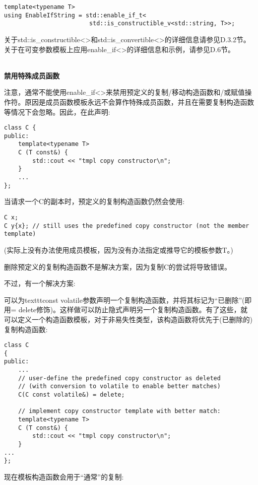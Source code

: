 \begin{lstlisting}[style=styleCXX]
template<typename T>
using EnableIfString = std::enable_if_t<
						std::is_constructible_v<std::string, T>>;
\end{lstlisting}

关于std::is\_constructible<>和std::is\_convertible<>的详细信息请参见D.3.2节。关于在可变参数模板上应用enable\_if<>的详细信息和示例，请参见D.6节。

\hspace*{\fill} \\ %
\noindent
\textbf{禁用特殊成员函数}

注意，通常不能使用enable\_if<>来禁用预定义的复制/移动构造函数和/或赋值操作符。原因是成员函数模板永远不会算作特殊成员函数，并且在需要复制构造函数等情况下会忽略。因此，在此声明:

\begin{lstlisting}[style=styleCXX]
class C {
public:
	template<typename T>
	C (T const&) {
		std::cout << "tmpl copy constructor\n";
	}
	...
};
\end{lstlisting}

当请求一个C的副本时，预定义的复制构造函数仍然会使用:

\begin{lstlisting}[style=styleCXX]
C x;
C y{x}; // still uses the predefined copy constructor (not the member template)
\end{lstlisting}

(实际上没有办法使用成员模板，因为没有办法指定或推导它的模板参数T。)

删除预定义的复制构造函数不是解决方案，因为复制C的尝试将导致错误。

不过，有一个解决方案:

可以为texttt{const volatile}参数声明一个复制构造函数，并将其标记为“已删除”(即用= delete修饰)。这样做可以防止隐式声明另一个复制构造函数。有了这些，就可以定义一个构造函数模板，对于非易失性类型，该构造函数将优先于(已删除的)复制构造函数:

\begin{lstlisting}[style=styleCXX]
class C
{
public:
	...
	// user-define the predefined copy constructor as deleted
	// (with conversion to volatile to enable better matches)
	C(C const volatile&) = delete;
	
	// implement copy constructor template with better match:
	template<typename T>
	C (T const&) {
		std::cout << "tmpl copy constructor\n";
	}
...
};
\end{lstlisting}

现在模板构造函数会用于“通常”的复制:

